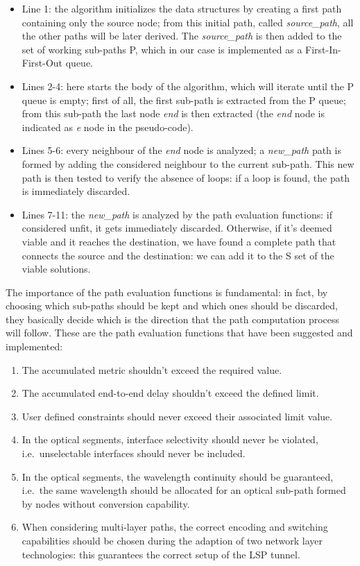 \documentclass[10pt,a4paper]{report}
\begin{document}
\begin{itemize}
\item Line 1: the algorithm initializes the data structures by
  creating a first path containing only the source node; from this
  initial path, called \textit{source\_path}, all the other paths will
  be later derived. The \textit{source\_path} is then added to the set
  of working sub-paths P, which in our case is implemented as a
  First-In-First-Out queue.
\item Lines 2-4: here starts the body of the algorithm, which will
  iterate until the P queue is empty; first of all, the first sub-path
  is extracted from the P queue; from this sub-path the last node
  \textit{end} is then extracted (the \textit{end} node is indicated
  as \textit{e} node in the pseudo-code).
\item Lines 5-6: every neighbour of the \textit{end} node is analyzed;
  a \textit{new\_path} path is formed by adding the considered
  neighbour to the current sub-path. This new path is then tested to
  verify the absence of loops: if a loop is found, the path is
  immediately discarded.
\item Lines 7-11: the \textit{new\_path} is analyzed by the path
  evaluation functions: if considered unfit, it gets immediately
  discarded. Otherwise, if it's deemed viable and it reaches the
  destination, we have found a complete path that connects the source
  and the destination: we can add it to the S set of the viable
  solutions.
\end{itemize}

The importance of the path evaluation functions is fundamental: in
fact, by choosing which sub-paths should be kept and which ones should
be discarded, they basically decide which is the direction that the
path computation process will follow. These are the path evaluation
functions that have been suggested and implemented:

\begin{enumerate}
\item The accumulated metric shouldn't exceed the required value.
\item The accumulated end-to-end delay shouldn't exceed the defined
  limit.
\item User defined constraints should never exceed their associated
  limit value.
\item In the optical segments, interface selectivity should never be
  violated, i.e.\ unselectable interfaces should never be included.
\item In the optical segments, the wavelength continuity should be
  guaranteed, i.e.\ the same wavelength should be allocated for an
  optical sub-path formed by nodes without conversion capability.
\item When considering multi-layer paths, the correct encoding and
  switching capabilities should be chosen during the adaption of two
  network layer technologies: this guarantees the correct setup of the
  LSP tunnel.
\end{enumerate}
\end{document}
